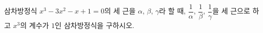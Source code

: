 삼차방정식 $x^3-3x^2-x+1=0$의 세 근을 $\alpha$, $\beta$, $\gamma$라 할 때, $\dfrac{1}{\alpha}$, $\dfrac{1}{\beta}$, $\dfrac{1}{\gamma}$을 세 근으로 하고 $x^3$의 계수가 $1$인 삼차방정식을 구하시오.

